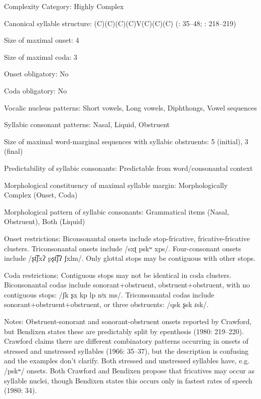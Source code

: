 {\begin{appendixdesc}
\item[Complexity Category:] Highly Complex

\item[Canonical syllable structure:] (C)(C)(C)(C)V(C)(C)(C) (\citealt{Crawford1966}: 35--48; \citealt{Bendixen1980}: 218--219)

\item[Size of maximal onset:] 4

\item[Size of maximal coda:] 3

\item[Onset obligatory:] No

\item[Coda obligatory:] No

\item[Vocalic nucleus patterns:] Short vowels, Long vowels, Diphthongs, Vowel sequences

\item[Syllabic consonant patterns:] Nasal, Liquid, Obstruent

\item[Size of maximal word-marginal sequences with syllabic obstruents:] 5 (initial), 3 (final)

\item[Predictability of syllabic consonants:] Predictable from word/consonantal context

\item[Morphological constituency of maximal syllable margin:] Morphologically Complex (Onset, Coda)

\item[Morphological pattern of syllabic consonants:] Grammatical items (Nasal, Obstruent), Both (Liquid)

\item[Onset restrictions:] Biconsonantal onsets include stop-fricative, fricative-fricative clusters. Triconsonantal onsets include /sxʈ pskʷ xps/. Four-consonant onsets include /ʂt͡ʃxʔ pʂt͡ʃʔ ʃxlm/. Only glottal stops may be contiguous with other stops.

\item[Coda restrictions:] Contiguous stops may not be identical in coda clusters. Biconsonantal codas include sonorant+obstruent, obstruent+obstruent, with no contiguous stops: /ʃk ʂx kp lp nʲx ms/. Triconsonantal codas include sonorant+obstruent+obstruent, or three obstruents: /qsk ʂsk ɾsk/.

\item[Notes:] Obstruent-sonorant and sonorant-obstruent onsets reported by Crawford, but Bendixen states these are predictably split by epenthesis (1980: 219--220). Crawford claims there are different combinatory patterns occurring in onsets of stressed and unstressed syllables (1966: 35--37), but the description is confusing and the examples don’t clarify. Both stressed and unstressed syllables have, e.g. /pskʷ/ onsets. Both Crawford and Bendixen propose that fricatives may occur as syllable nuclei, though Bendixen states this occurs only in fastest rates of speech (1980: 34).
\end{appendixdesc}
}
